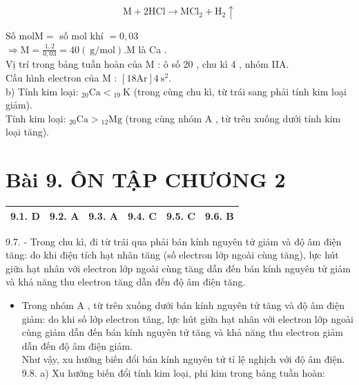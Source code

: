 \documentclass[10pt]{article}
\begin{document}
$$
\mathrm{M}+2 \mathrm{HCl} \rightarrow \mathrm{MCl}_{2}+\mathrm{H}_{2} \uparrow
$$

Số $\mathrm{mol} \mathrm{M}=$ số mol khí $=0,03$\\
$\Rightarrow \mathrm{M}=\frac{1,2}{0,03}=40(\mathrm{~g} / \mathrm{mol}) . \mathrm{M}$ là Ca .\\
Vị trí trong bảng tuần hoàn của M : ô số 20 , chu kì 4 , nhóm IIA.\\
Cấu hình electron của M : $[18 \mathrm{Ar}] 4 \mathrm{~s}^{2}$.\\
b) Tính kim loại: ${ }_{20} \mathrm{Ca}<{ }_{19} \mathrm{~K}$ (trong cùng chu kì, từ trái sang phải tính kim loại giảm).\\
Tính kim loại: ${ }_{20} \mathrm{Ca}>{ }_{12} \mathrm{Mg}$ (trong cùng nhóm A , từ trên xuống dưới tính kim loại tăng).

\section*{Bài 9. ÔN TẬP CHƯƠNG 2}
\begin{center}
\begin{tabular}{|l|l|l|l|l|l|}
\hline
9.1. D & 9.2. A & 9.3. A & 9.4. C & 9.5. C & 9.6. B \\
\hline
\end{tabular}
\end{center}

9.7. - Trong chu kì, đi từ trái qua phải bán kính nguyên tử giảm và độ âm điện tăng: do khi điện tích hạt nhân tăng (số electron lớp ngoài cùng tăng), lực hút giữa hạt nhân với electron lớp ngoài cùng tăng dẫn đến bán kính nguyên tử giảm và khả năng thu electron tăng dẫn đến độ âm điện tăng.

\begin{itemize}
  \item Trong nhóm A , từ trên xuống dưới bán kính nguyên tử tăng và độ âm điện giảm: do khi số lớp electron tăng, lực hút giữa hạt nhân với electron lớp ngoài cùng giảm dẫn đến bán kính nguyên tử tăng và khả năng thu electron giảm dẫn đến độ âm điện giảm.\\
Như vậy, xu hướng biến đổi bán kính nguyên tử tỉ lệ nghịch với độ âm điện.\\
9.8. a) Xu hướng biến đổi tính kim loại, phi kim trong bảng tuần hoàn:
\end{itemize}
\end{document}

